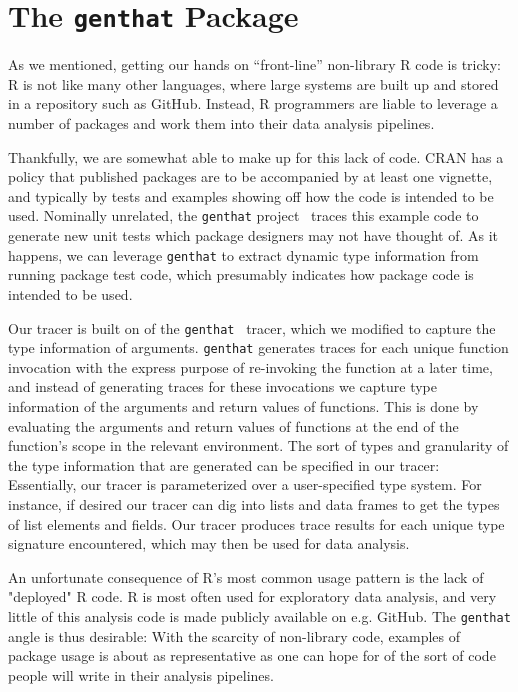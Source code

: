 \documentclass[acmsmall,10pt,review,anonymous]{acmart}\settopmatter{printfolios=true,printccs=false,printacmref=false}
\begin{document}
%
%
%
%
\section{The \texttt{genthat} Package}
\label{sec:genthat}

As we mentioned, getting our hands on ``front-line'' non-library R code is tricky: 
R is not like many other languages, where large systems are built up and stored in a repository such as GitHub.  
Instead, R programmers are liable to leverage a number of packages and work them into their data analysis pipelines.

Thankfully, we are somewhat able to make up for this lack of code.
CRAN has a policy that published packages are to be accompanied by at least one vignette, and typically by tests and examples showing off how the code is intended to be used.  
Nominally unrelated, the {\tt genthat} project~\cite{issta18} traces this example code to generate new unit tests which package designers may not have thought of.
As it happens, we can leverage {\tt genthat} to extract dynamic type information from running package test code, which presumably indicates how package code is intended to be used.


Our tracer is built on of the {\tt genthat}~\cite{issta18} tracer, which we modified to capture the type information of arguments.  
{\tt genthat} generates traces for each unique function invocation with the express purpose of re-invoking the function at a later time, and instead of generating traces for these invocations we capture type information of the arguments and return values of functions.
This is done by evaluating the arguments and return values of functions at the end of the function's scope in the relevant environment.  
The sort of types and granularity of the type information that are generated can be specified in our tracer: 
Essentially, our tracer is parameterized over a user-specified type system.  
For instance, if desired our tracer can dig into lists and data frames to get the types of list elements and fields.
Our tracer produces trace results for each unique type signature encountered, which may then be used for data analysis.

An unfortunate consequence of R's most common usage pattern is the lack of "deployed" R code. 
R is most often used for exploratory data analysis, and very little of this analysis code is made publicly available on e.g. GitHub.
The {\tt genthat} angle is thus desirable: 
With the scarcity of non-library code, examples of package usage is about as representative as one can hope for of the sort of code people will write in their analysis pipelines.
\end{document}
